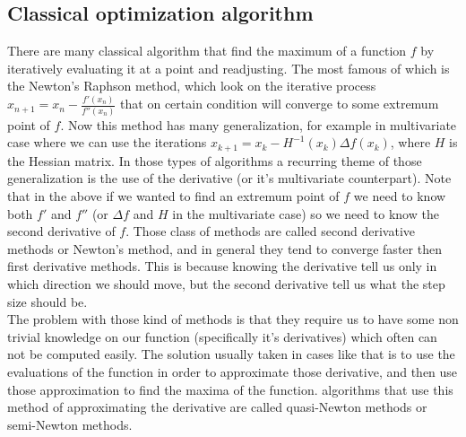 \documentclass[12pt]{amsart}
\numberwithin{equation}{section}
\theoremstyle{definition}
\begin{document}
\subsection{ Classical optimization algorithm}
There are many classical algorithm that find the maximum of a function $f$ by iteratively evaluating it at a point and readjusting. The most famous of which is the Newton's Raphson method, which look on the iterative process $x_{n+1}=x_n-\frac{f'(x_n)}{f''(x_n)}$ that on certain condition will converge to some extremum point of $f$. Now this method has many generalization, for example in multivariate case where we can use the iterations $x_{k+1}=x_k-H^{-1}(x_k)\Delta f(x_k)$, where $H$ is the Hessian matrix. In those types of algorithms a recurring theme of those generalization is the use of the derivative (or it's multivariate counterpart). Note that in the above if we wanted to find an extremum point of $f$ we need to know both $f'$ and $f''$ (or $\Delta f$ and $H$ in the multivariate case) so we need to know the second derivative of $f$. Those class of methods are called second derivative methods or Newton's method, and in general they tend to converge faster then first derivative methods. This is because knowing the derivative tell us only in which direction we should move, but the second derivative tell us what the step size should be. 
\[\]
The problem with those kind of methods is that they require us to have some non trivial knowledge on our function (specifically it's derivatives) which often can not be computed easily. The solution usually taken in cases like that is to use the evaluations of the function in order to approximate those derivative, and then use those approximation to find the maxima of the function. algorithms that use this method of approximating the derivative are called quasi-Newton methods or semi-Newton methods.
\end{document}
